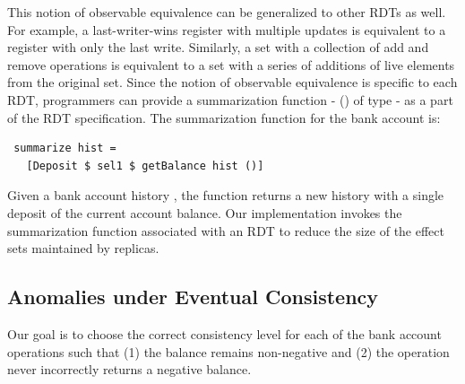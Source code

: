 This notion of observable equivalence can be generalized to other RDTs as well.
For example, a last-writer-wins register with multiple updates is equivalent to
a register with only the last write. Similarly, a set with a collection of add
and remove operations is equivalent to a set with a series of additions of live
elements from the original set. Since the notion of observable equivalence is
specific to each RDT, programmers can provide a summarization
function - () of type \cf{[e] -> [e]} -  as a part of
the RDT specification. The summarization function for the bank account is:

{\small
\begin{verbatim}
 summarize hist = 
   [Deposit $ sel1 $ getBalance hist ()]
\end{verbatim}}

\noindent Given a bank account history , the 
function returns a new history with a single deposit of the current
account balance. Our implementation invokes the summarization function
associated with an RDT to reduce the size of the effect sets
maintained by replicas.

\subsection{Anomalies under Eventual Consistency}

Our goal is to choose the correct consistency level for each of the bank
account operations such that (1) the balance remains non-negative and (2) the
 operation never incorrectly returns a negative balance.

